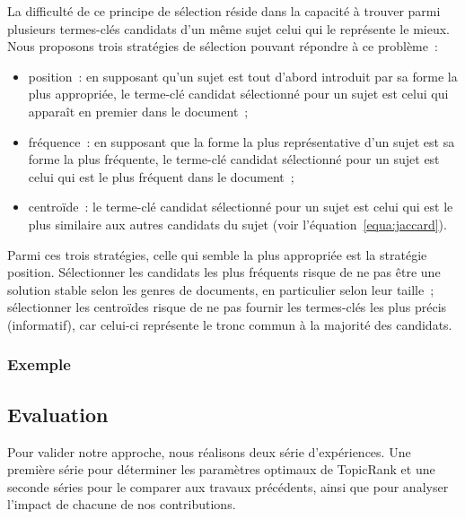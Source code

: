         La difficulté de ce principe de sélection réside dans la capacité à
        trouver parmi plusieurs termes-clés candidats d'un même sujet celui qui
        le représente le mieux. Nous proposons trois stratégies de sélection
        pouvant répondre à ce problème~:
        \begin{itemize}
          \item{position~: en supposant qu'un sujet est tout d'abord
                introduit par sa forme la plus appropriée, le terme-clé
                candidat sélectionné pour un sujet est celui qui apparaît en
                premier dans le document~;}
          \item{fréquence~: en supposant que la forme la plus représentative
                d'un sujet est sa forme la plus fréquente, le terme-clé candidat
                sélectionné pour un sujet est celui qui est le plus fréquent
                dans le document~;}
          \item{centroïde~: le terme-clé candidat sélectionné pour un sujet
                est celui qui est le plus similaire aux autres candidats du
                sujet (voir l'équation~\ref{equa:jaccard}).}
        \end{itemize}
        Parmi ces trois stratégies, celle qui semble la plus appropriée est la
        stratégie position. Sélectionner les candidats les plus fréquents risque
        de ne pas être une solution stable selon les genres de documents, en
        particulier selon leur taille~; sélectionner les centroïdes risque de ne
        pas fournir les termes-clés les plus précis (informatif), car celui-ci
        représente le tronc commun à la majorité des candidats.

      \subsubsection{Exemple}
      \label{subsubsec:main-automatic_keyphrase_annotation-unsupervised_automatic_keyphrase_extraction-topicrank-example}

    \subsection{Evaluation}
    \label{subsec:main-automatic_keyphrase_annotation-unsupervised_automatic_keyphrase_extraction-evaluation}
      Pour valider notre approche, nous réalisons deux série d'expériences. Une
      première série pour déterminer les paramètres optimaux de TopicRank et
      une seconde séries pour le comparer aux travaux précédents, ainsi
      que pour analyser l'impact de chacune de nos contributions.
      
